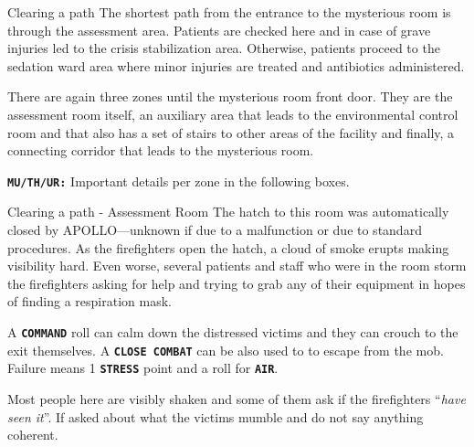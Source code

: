 \begin{rpg-commentbox}{Clearing a path}
    The shortest path from the entrance to the mysterious room is through the assessment area. Patients are checked here and in case of grave injuries led to the crisis stabilization area. Otherwise, patients proceed to the sedation ward area where minor injuries are treated and antibiotics administered. 
    
    There are again three zones until the mysterious room front door. They are the assessment room itself, an auxiliary area that leads to the environmental control room and  that also has a set of stairs to other areas of the facility and finally, a connecting corridor that leads to the mysterious room.
    
    \texttt{\textbf{MU/TH/UR:}} Important details per zone in the following boxes.
\end{rpg-commentbox}      

\begin{rpg-commentbox}{Clearing a path - Assessment Room}
    The hatch to this room was automatically closed by APOLLO---unknown if due to a malfunction or due to standard procedures. As the firefighters open the hatch, a cloud of smoke erupts making visibility hard. Even worse, several patients and staff who were in the room storm the firefighters asking for help and trying to grab any of their equipment in hopes of finding a respiration mask. 

    A \texttt{\textbf{COMMAND}} roll can calm down the distressed victims and they can crouch to the exit themselves. A \texttt{\textbf{CLOSE COMBAT}} can be also used to to escape from the mob. 
    Failure means 1 \texttt{\textbf{STRESS}} point and a roll for \texttt{\textbf{AIR}}.

    Most people here are visibly shaken and some of them ask if the firefighters ``\textit{have seen it}''. If asked about what the victims mumble and do not say anything coherent. 
\end{rpg-commentbox}  



